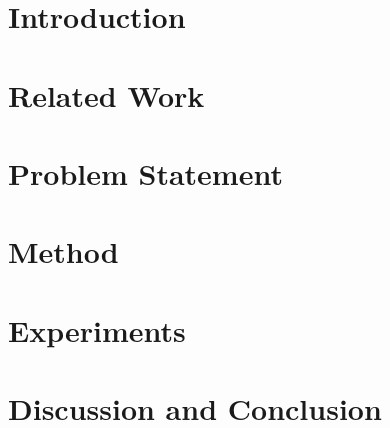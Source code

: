 \documentclass[letterpaper, 10 pt, conference]{ieeeconf}
\author{Anonymous Authors}
\begin{document}

\maketitle
\thispagestyle{empty}
\pagestyle{empty}

\begin{abstract}

\end{abstract}

\section{Introduction}
\label{sec:introduction}


\section{Related Work}
\label{sec:related-work}


\section{Problem Statement}
\label{sec:problem-statement}


\section{Method}
\label{sec:method}


\section{Experiments}
\label{sec:experiments}


\section{Discussion and Conclusion}
\label{sec:conclusion}





\end{document}
